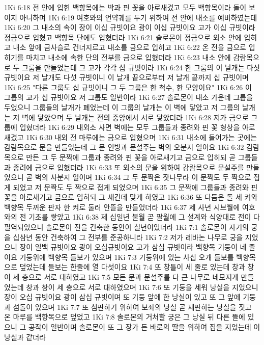 1Ki 6:18  전 안에 입힌 백향목에는 박과 핀 꽃을 아로새겼고 모두 백향목이라 돌이 보이지 아니하며
1Ki 6:19  여호와의 언약궤를 두기 위하여 전 안에 내소를 예비하였는데
1Ki 6:20  그 내소의 속이 장이 이십 규빗이요 광이 이십 규빗이요 고가 이십 규빗이라 정금으로 입혔고 백향목 단에도 입혔더라
1Ki 6:21  솔로몬이 정금으로 외소 안에 입히고 내소 앞에 금사슬로 건너지르고 내소를 금으로 입히고
1Ki 6:22  온 전을 금으로 입히기를 마치고 내소에 속한 단의 전부를 금으로 입혔더라
1Ki 6:23  내소 안에 감람목으로 두 그룹을 만들었는데 그 고가 각각 십 규빗이라
1Ki 6:24  한 그룹의 이 날개는 다섯 규빗이요 저 날개도 다섯 규빗이니 이 날개 끝으로부터 저 날개 끝까지 십 규빗이며
1Ki 6:25  "다른 그룹도 십 규빗이니 그 두 그룹은 한 척수, 한 모양이요"
1Ki 6:26  이 그룹의 고가 십 규빗이요 저 그룹도 일반이라
1Ki 6:27  솔로몬이 내소 가운데 그룹을 두었으니 그룹들의 날개가 폐었는데 이 그룹의 날개는 이 벽에 닿았고 저 그룹의 날개는 저 벽에 닿았으며 두 날개는 전의 중앙에서 서로 닿았더라
1Ki 6:28  저가 금으로 그룹에 입혔더라
1Ki 6:29  내외소 사면 벽에는 모두 그룹들과 종려와 핀 꽃 형상을 아로새겼고
1Ki 6:30  내외 전 마루에는 금으로 입혔으며
1Ki 6:31  내소에 들어가는 곳에는 감람목으로 문을 만들었는데 그 문 인방과 문설주는 벽의 오분지 일이요
1Ki 6:32  감람목으로 만든 그 두 문짝에 그룹과 종려와 핀 꽃을 아로새기고 금으로 입히되 곧 그룹들과 종려에 금으로 입혔더라
1Ki 6:33  또 외소의 문을 위하여 감람목으로 문설주를 만들었으니 곧 벽의 사분지 일이며
1Ki 6:34  그 두 문짝은 잣나무라 이 문짝도 두 짝으로 접게 되었고 저 문짝도 두 짝으로 접게 되었으며
1Ki 6:35  그 문짝에 그룹들과 종려와 핀 꽃을 아로새기고 금으로 입히되 그 새긴데 맞게 하였고
1Ki 6:36  또 다듬은 돌 세 켜와 백향목 두꺼운 판자 한 켜로 둘러 안뜰을 만들었더라
1Ki 6:37  제 사년 시브월에 여호와의 전 기초를 쌓았고
1Ki 6:38  제 십일년 불월 곧 팔월에 그 설계와 식양대로 전이 다 필역되었으니 솔로몬이 전을 건축한 동안이 칠년이었더라
1Ki 7:1  솔로몬이 자기의 궁을 십삼년 동안 건축하여 그 전부를 준공하니라
1Ki 7:2  저가 레바논 나무로 궁을 지었으니 장이 일백 규빗이요 광이 오십규빗이요 고가 삼십 규빗이라 백향목 기둥이 네 줄이요 기둥위에 백향목 들보가 있으며
1Ki 7:3  기둥위에 있는 사십 오개 들보를 백향목으로 덮었는데 들보는 한줄에 열 다섯이요
1Ki 7:4  또 창틀이 세 줄로 있는데 창과 창이 세 층으로 서로 대하였고
1Ki 7:5  모든 문과 문설주를 다 큰 나무로 네모지게 만들었는데 창과 창이 세 층으로 서로 대하였으며
1Ki 7:6  또 기둥을 세워 낭실을 지었으니 장이 오십 규빗이요 광이 삼십 규빗이며 또 기둥 앞에 한 낭실이 있고 또 그 앞에 기둥과 섬돌이 있으며
1Ki 7:7  또 심판하기 위하여 보좌의 낭실 곧 재판하는 낭실을 짓고 온 마루를 백향목으로 덮었고
1Ki 7:8  솔로몬의 거처할 궁은 그 낭실 뒤 다른 뜰에 있으니 그 공작이 일반이며 솔로몬이 또 그 장가 든 바로의 딸을 위하여 집을 지었는데 이 낭실과 같더라
